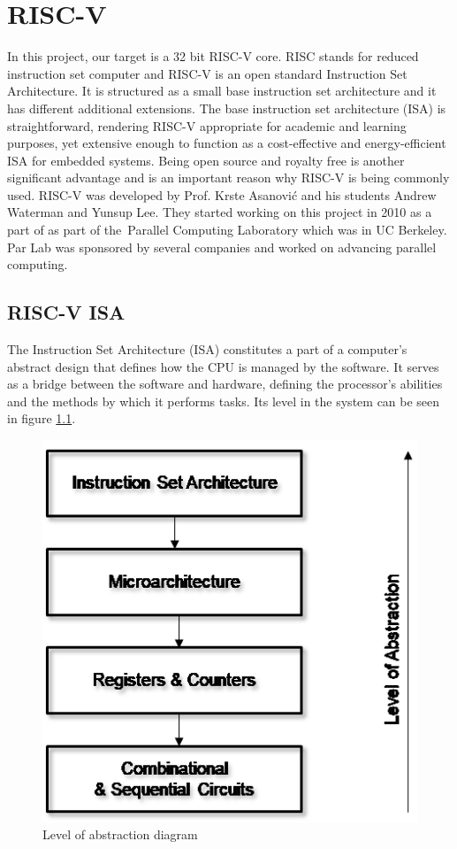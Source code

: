\clearpage
\chapter{RISC-V}\label{Ch8}
In this project, our target is a 32 bit RISC-V core. RISC stands for reduced instruction set computer and RISC-V is an open standard Instruction Set Architecture. \cite{riscvorgabout} It is structured as a small base instruction set architecture and it has different additional extensions. The base instruction set architecture (ISA) is straightforward, rendering RISC-V appropriate for academic and learning purposes, yet extensive enough to function as a cost-effective and energy-efficient ISA for embedded systems. \cite{watermanriscv} Being open source and royalty free is another significant advantage and is an important reason why RISC-V is being commonly used. 
RISC-V was developed by Prof. Krste Asanović and his students Andrew Waterman and Yunsup Lee. They started working on this project in 2010 as a part of as part of the Parallel Computing Laboratory which was in UC Berkeley. Par Lab was sponsored by several companies and worked on advancing parallel computing.

\section{RISC-V ISA}
The Instruction Set Architecture (ISA) constitutes a part of a computer’s abstract design that defines how the CPU is managed by the software. It serves as a bridge between the software and hardware, defining the processor’s abilities and the methods by which it performs tasks. Its level in the system can be seen in figure \ref{fig:level_of_abstraction_diagram}.

\begin{figure}[h!]
    \centering
    \includegraphics{riscv/level_of_abstraction_diagram.png}
    \caption{Level of abstraction diagram \cite{levelofabstrac}}
    \label{fig:level_of_abstraction_diagram}
\end{figure}

